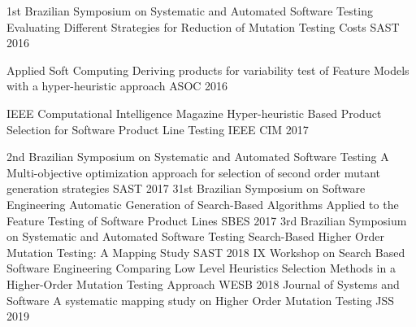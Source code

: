 

\begin{cventries}

\cventry
	{1st Brazilian Symposium on Systematic and Automated Software Testing} %
	{Evaluating Different Strategies for Reduction of Mutation Testing Costs} %
	{SAST} %
	{2016} %
	{
	}

\cventry
	{Applied Soft Computing} %
	{Deriving products for variability test of Feature Models with a hyper-heuristic approach} %
	{ASOC} %
	{2016} %
	{
	}

  \cventry
    {IEEE Computational Intelligence Magazine} %
    {Hyper-heuristic Based Product Selection for Software Product Line Testing} %
    {IEEE CIM} %
    {2017} %
	{
	}

  \cventry
    {2nd Brazilian Symposium on Systematic and Automated Software Testing} %
    {A Multi-objective optimization approach for selection of second order mutant generation strategies} %
    {SAST} %
    {2017} %
	{
    }
  \cventry
    {31st Brazilian Symposium on Software Engineering} %
    {Automatic Generation of Search-Based Algorithms Applied to the Feature Testing of Software Product Lines} %
    {SBES} %
    {2017} %
	{
    }
  \cventry
    {3rd Brazilian Symposium on Systematic and Automated Software Testing} %
    {Search-Based Higher Order Mutation Testing: A Mapping Study} %
    {SAST} %
    {2018} %
	{
    }
  \cventry
    {IX Workshop on Search Based Software Engineering} %
    {Comparing Low Level Heuristics Selection Methods in a Higher-Order Mutation Testing Approach} %
    {WESB} %
    {2018} %
	{
    }
  \cventry
    {Journal of Systems and Software} %
    {A systematic mapping study on Higher Order Mutation Testing} %
    {JSS} %
    {2019} %
	{
    }
\end{cventries}
